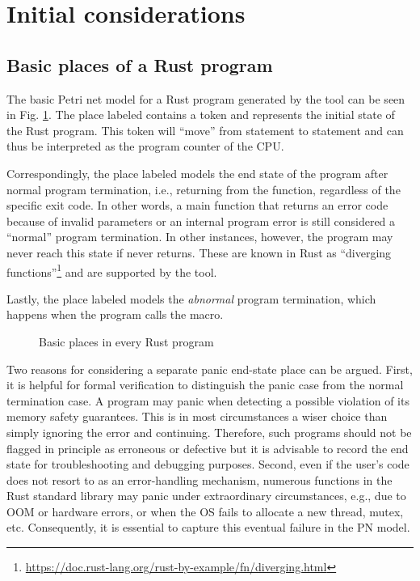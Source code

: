 \section{Initial considerations}

\subsection{Basic places of a Rust program}
\label{sec:basic-places}

The basic Petri net model for a Rust program generated by the tool
can be seen in Fig. \ref{fig:program-places}.
The place labeled  contains a token
and represents the initial state of the Rust program.
This token will ``move'' from statement to statement
and can thus be interpreted as the program counter of the \acrshort{CPU}.

Correspondingly, the place labeled  models
the end state of the program after normal program termination,
i.e., returning from the  function,
regardless of the specific exit code.
In other words, a main function that returns an error code because of invalid parameters
or an internal program error is still considered a ``normal'' program termination.
In other instances, however, the program may never reach this state
if  never returns.
These are known in Rust as ``diverging functions''\footnote{\url{https://doc.rust-lang.org/rust-by-example/fn/diverging.html}}
and are supported by the tool.

Lastly, the place labeled  models
the \emph{abnormal} program termination,
which happens when the program calls the  macro.

\begin{figure}[!htb]
  \centering
  
  \caption{Basic places in every Rust program}
  \label{fig:program-places}
\end{figure}

Two reasons for considering a separate panic end-state place can be argued.
First, it is helpful for formal verification to distinguish the panic case
from the normal termination case.
A program may panic when detecting a possible violation of its memory safety guarantees.
This is in most circumstances a wiser choice than simply ignoring the error and continuing.
Therefore, such programs should not be flagged in principle as erroneous or defective but
it is advisable to record the end state for troubleshooting and debugging purposes.
Second, even if the user's code does not resort to 
as an error-handling mechanism, numerous functions in the Rust standard library
may panic under extraordinary circumstances, e.g., due to \acrfull{OOM} or hardware errors,
or when the \acrshort{OS} fails to allocate a new thread, mutex, etc.
Consequently, it is essential to capture this eventual failure in the \acrshort{PN} model.

